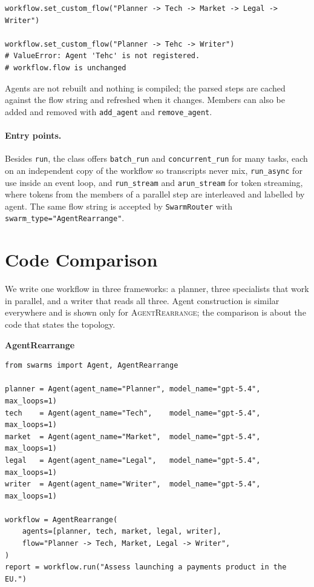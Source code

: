 \documentclass[11pt]{article}
\newcommand{\code}[1]{\texttt{#1}}
\newcommand{\AR}{\textsc{AgentRearrange}}
\newcommand{\listinghead}[1]{\medskip\noindent\textbf{#1}\par\nopagebreak}
\begin{document}
\begin{lstlisting}
workflow.set_custom_flow("Planner -> Tech -> Market -> Legal -> Writer")

workflow.set_custom_flow("Planner -> Tehc -> Writer")
# ValueError: Agent 'Tehc' is not registered.
# workflow.flow is unchanged
\end{lstlisting}

\noindent Agents are not rebuilt and nothing is compiled; the parsed steps are cached against the flow string and refreshed when it changes. Members can also be added and removed with \code{add\_agent} and \code{remove\_agent}.

\paragraph{Entry points.}
Besides \code{run}, the class offers \code{batch\_run} and \code{concurrent\_run} for many tasks, each on an independent copy of the workflow so transcripts never mix, \code{run\_async} for use inside an event loop, and \code{run\_stream} and \code{arun\_stream} for token streaming, where tokens from the members of a parallel step are interleaved and labelled by agent. The same flow string is accepted by \code{SwarmRouter} with \code{swarm\_type="AgentRearrange"}.

\section{Code Comparison}
\label{sec:code}

We write one workflow in three frameworks: a planner, three specialists that work in parallel, and a writer that reads all three. Agent construction is similar everywhere and is shown only for \AR{}; the comparison is about the code that states the topology.

\listinghead{AgentRearrange}
\begin{lstlisting}
from swarms import Agent, AgentRearrange

planner = Agent(agent_name="Planner", model_name="gpt-5.4", max_loops=1)
tech    = Agent(agent_name="Tech",    model_name="gpt-5.4", max_loops=1)
market  = Agent(agent_name="Market",  model_name="gpt-5.4", max_loops=1)
legal   = Agent(agent_name="Legal",   model_name="gpt-5.4", max_loops=1)
writer  = Agent(agent_name="Writer",  model_name="gpt-5.4", max_loops=1)

workflow = AgentRearrange(
    agents=[planner, tech, market, legal, writer],
    flow="Planner -> Tech, Market, Legal -> Writer",
)
report = workflow.run("Assess launching a payments product in the EU.")
\end{lstlisting}
\end{document}
